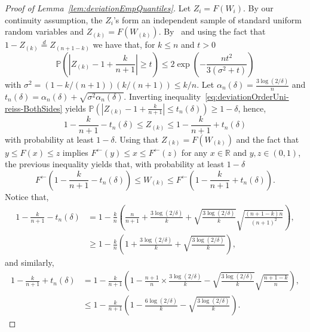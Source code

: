 \documentclass{article}
\numberwithin{equation}{section}
\newcommand{\R}{\mathbb{R}}
\renewcommand{\P}{\mathbb{P}}
\newcommand{\eqd}{\overset{d}{=}}
\begin{document}
\begin{proof}[Proof of Lemma~\ref{lem:deviationEmpQuantiles}]
    Let $Z_i = F(W_i)$. By our continuity assumption, the $Z_i$'s
    form an independent sample of standard uniform random
    variables and \(Z_{(k)}=F(W_{(k)})\). By~\cite[Lemma
    3.1.1.]{reiss2012approximate}
    and using the fact that \(1-Z_{(k)}\eqd Z_{(n+1-k)}\)
    we have that, for \(k\leq n\) and \(t>0\)
    \begin{equation}\label{eq:deviationOrderUni-reiss-BothSides}
        \P\left( \left| Z_{(k)} -1 +\frac{k}{n+1} \right|\geq t
        \right)\leq 2\exp{\left(-\frac{nt^2}{3\left(\sigma^2+t\right)}\right)}
    \end{equation}
    with $\sigma^2 = (1-k/(n+1))({k}/(n+1))\leq k/n$. Let
    \(\alpha_n(\delta)=\frac{3\log{(2/\delta)}}{n}\) and
    \(t_n({\delta})=\alpha_n(\delta)+\sqrt{\sigma^2\alpha_n(\delta)}\).
    Inverting inequality~\eqref{eq:deviationOrderUni-reiss-BothSides}
    yields \(\P\left( \left| Z_{(k)} -1 +\frac{k}{n+1}
    \right|\leq t_n{(\delta)} \right)\geq 1-\delta\), hence,
    \begin{equation*}
        1-\frac{k}{n+1}-t_n{(\delta)}\leq Z_{(k)}\leq
        1-\frac{k}{n+1} + t_n(\delta)
    \end{equation*}
    with probability at least   \(1-\delta\). Using that
    \(Z_{(k)}=F(W_{(k)})\) and the fact that
    \(y\leq F(x) \leq z\) implies \( F^{\leftarrow}(y)\leq x \leq
    F^{\leftarrow}(z)\)
    for any \(x\in\R\) and \(y,z\in(0,1)\), the previous
    inequality yields that, with probability
    at least \(1-\delta\)
    \begin{equation*}
        F^{\leftarrow}\left(1-\frac{k}{n+1}-t_n{(\delta)}\right)\leq W_{(k)}\leq
        F^{\leftarrow}\left(1-\frac{k}{n+1} + t_n(\delta)\right).
    \end{equation*}
    Notice that,
    \begin{align*}
        1-\frac{k}{n+1}-t_n{(\delta)} & = 1-\frac{k}{n}\left(
            \frac{n}{n+1} + \frac{3\log(2/\delta)}{k} +
            \sqrt{\frac{3\log(2/\delta)}{k}}\sqrt{\frac{(n+1-k)n}{(n+1)^2}}
        \right),                                              \\
        & \geq
        1-\frac{k}{n}\left(1+\frac{3\log(2/\delta)}{k}+\sqrt{\frac{3\log(2/\delta)}{k}}\right),
    \end{align*}
    and similarly,
    \begin{align*}
        1-\frac{k}{n+1} + t_n(\delta) & = 1-\frac{k}{n+1}\left(
            1 -\frac{n+1}{n}\times\frac{3\log(2/\delta)}{k} -
            \sqrt{\frac{3\log(2/\delta)}{k}}\sqrt{\frac{n+1-k}{n}}
        \right),
        \\
        & \leq 1- \frac{k}{n+1}\left( 1-\frac{6 \log(2/\delta)}{k}
        - \sqrt{\frac{3\log(2/\delta)}{k}} \right).
    \end{align*}
\end{proof}
\end{document}
